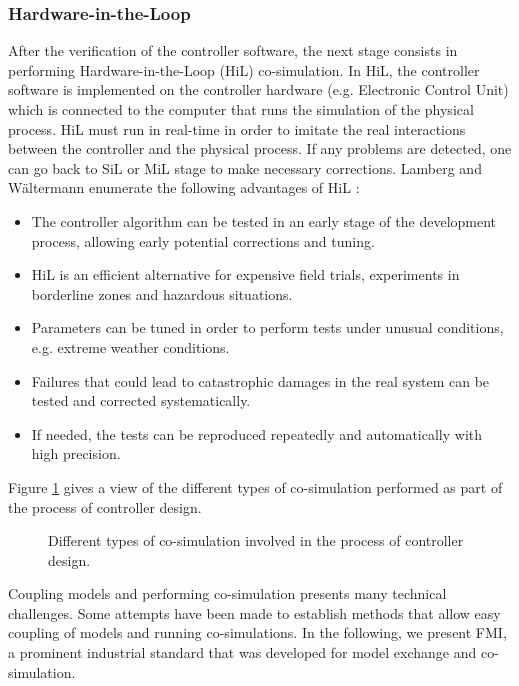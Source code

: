 \subsubsection{Hardware-in-the-Loop}

After the verification of the controller software, the next stage consists in performing Hardware-in-the-Loop (HiL) co-simulation. In HiL, the controller software is implemented on the controller hardware (e.g. Electronic Control Unit) which is connected to the computer that runs the simulation of the physical process. HiL must run in real-time in order to imitate the real interactions between the controller and the physical process. If any problems are detected, one can go back to SiL or MiL stage to make necessary corrections. Lamberg and W{\"a}ltermann enumerate the following advantages of HiL \cite{lamberg:2000}:

\begin{itemize}

\item The controller algorithm can be tested in an early stage of the development process, allowing early potential corrections and tuning.

\item HiL is an efficient alternative for expensive field trials, experiments in borderline zones and hazardous situations.

\item Parameters can be tuned in order to perform tests under unusual conditions, e.g. extreme weather conditions. 

\item Failures that could lead to catastrophic damages in the real system can be tested and corrected systematically.  

\item If needed, the tests can be reproduced repeatedly and automatically with high precision.

\end{itemize}

Figure \ref{fig:mbd} gives a view of the different types of co-simulation performed as part of the process of controller design.

\begin{figure}[phbt]
\centering

\caption{Different types of co-simulation involved in the process of controller design.}
\label{fig:mbd}
\end{figure}

Coupling models and performing co-simulation presents many technical challenges. Some attempts have been made to establish methods that allow easy coupling of models and running co-simulations. In the following, we present FMI, a prominent industrial standard that was developed for model exchange and co-simulation.  

